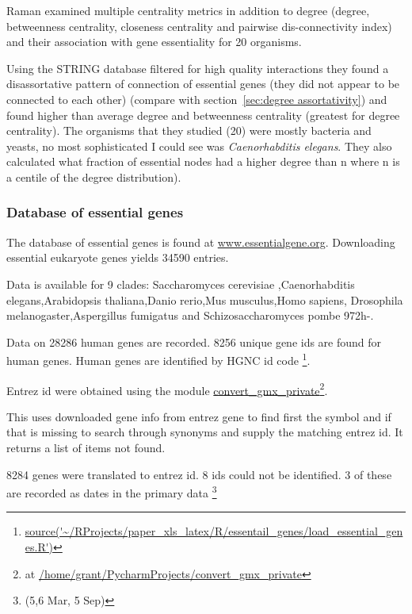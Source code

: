 Raman \cite{raman2014organisational} examined multiple centrality metrics in addition to degree (degree, betweenness centrality, closeness centrality and pairwise dis-connectivity index) and their association with gene essentiality for 20 organisms.

 Using the STRING database filtered for high quality interactions they found a disassortative pattern of connection of essential genes (they did not appear to be connected to each other)  (compare with section~\ref{sec:degree assortativity})  and found higher than average degree and betweenness centrality (greatest for degree centrality). The organisms that they studied (20) were mostly bacteria and yeasts, no most sophisticated I could see was \textit{Caenorhabditis elegans}. They also calculated what fraction of essential nodes had a higher degree than n where n is a centile of the degree distribution).
 
 
 \subsubsection{Database of essential genes}
 \label{sec:Database of essential genes}
 
 
 The database of essential genes is found at \url{www.essentialgene.org}. Downloading essential eukaryote genes yields 34590 entries.
 
 Data is available for 9 clades:  Saccharomyces cerevisiae   ,Caenorhabditis elegans,Arabidopsis thaliana,Danio rerio,Mus musculus,Homo sapiens,
 Drosophila melanogaster,Aspergillus fumigatus and Schizosaccharomyces pombe 972h-.
 
 Data on 28286  human genes are recorded. 8256 unique gene ids are found for human genes. Human genes are identified by HGNC id code \footnote{\url{source('~/RProjects/paper_xls_latex/R/essentail_genes/load_essential_genes.R')}}.
 
 Entrez id were obtained using the module \url{convert_gmx_private}\footnote{ at \url{/home/grant/PycharmProjects/convert_gmx_private}}.
 
 This uses downloaded gene info from entrez gene to find first the symbol and if that is missing to search through synonyms and supply the matching entrez id. It returns a list of items not found. 
 
8284 genes were translated to entrez id. 8 ids could not be identified. 3 of these are recorded as dates in the primary data \footnote{(5,6 Mar, 5 Sep)}
 
